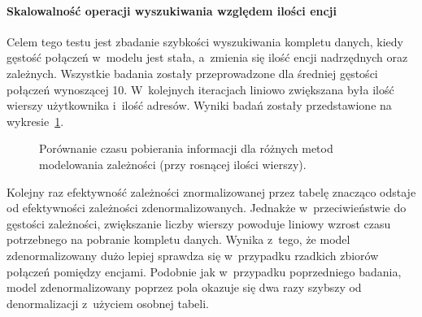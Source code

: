\paragraph{Skalowalność operacji wyszukiwania względem ilości encji}

Celem tego testu jest zbadanie szybkości wyszukiwania kompletu danych, kiedy gęstość połączeń w~modelu jest stała, a~zmienia się ilość encji nadrzędnych oraz zależnych. Wszystkie badania zostały przeprowadzone dla średniej gęstości połączeń wynoszącej 10. W~kolejnych iteracjach liniowo zwiększana była ilość wierszy użytkownika i~ilość adresów. Wyniki badań zostały przedstawione na wykresie~\ref{fig:select_time_relation_quantity_comparison}.

\begin{figure}[ht!]
	\centering

	\caption{Porównanie czasu pobierania informacji dla różnych metod modelowania zależności (przy rosnącej ilości wierszy).}
	\label{fig:select_time_relation_quantity_comparison}
\end{figure}

Kolejny raz efektywność zależności znormalizowanej przez tabelę znacząco odstaje od efektywności zależności zdenormalizowanych. Jednakże w~przeciwieństwie do gęstości zależności, zwiększanie liczby wierszy powoduje liniowy wzrost czasu potrzebnego na pobranie kompletu danych. Wynika z~tego, że model zdenormalizowany dużo lepiej sprawdza się w~przypadku rzadkich zbiorów połączeń pomiędzy encjami. Podobnie jak w~przypadku poprzedniego badania, model zdenormalizowany poprzez pola okazuje się dwa razy szybszy od denormalizacji z~użyciem osobnej tabeli.

